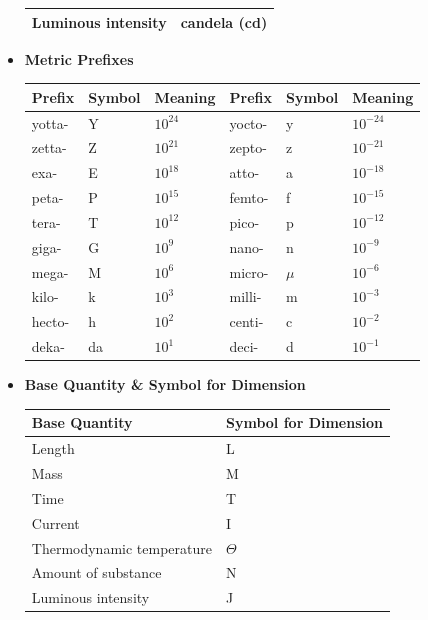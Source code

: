 \documentclass{report}
\begin{document}
\begin{itemize}
\begin{tabularx}{\textwidth}{|X|X|}
                Luminous intensity & candela (cd) \\
                \hline
            \end{tabularx}
            \pagebreak 
        \item \textbf{Metric Prefixes}
            \begin{center}
                \begin{tabularx}{\textwidth}{|X|X|X|X|X|X|}
                    \hline
                    Prefix & Symbol & Meaning & Prefix & Symbol & Meaning \\ 
                    \hline
                    yotta- & Y & $10^{24}$ & yocto- & y & $10^{-24}$ \\
                    zetta- & Z & $10^{21}$ & zepto- & z & $10^{-21}$ \\
                    exa-   & E & $10^{18}$ & atto-  & a & $10^{-18}$ \\
                    peta-  & P & $10^{15}$ & femto- & f & $10^{-15}$ \\
                    tera-  & T & $10^{12}$ & pico-  & p & $10^{-12}$ \\
                    giga-  & G & $10^9$   & nano-  & n & $10^{-9}$  \\
                    mega-  & M & $10^6$   & micro- & $\mu$ & $10^{-6}$ \\
                    kilo-  & k & $10^3$   & milli- & m & $10^{-3}$ \\
                    hecto- & h & $10^2$   & centi- & c & $10^{-2}$ \\
                    deka-  & da & $10^1$  & deci-  & d & $10^{-1}$ \\
                    \hline
                \end{tabularx}
            \end{center}
            \bigbreak \noindent 
        \item \textbf{Base Quantity \& Symbol for Dimension}
            \begin{center}
                \begin{tabularx}{\textwidth}{|X|X|}
                    \hline
                    Base Quantity & Symbol for Dimension \\
                    \hline
                    Length & L \\
                    Mass & M \\
                    Time & T \\
                    Current & I \\
                    Thermodynamic temperature & $\Theta$ \\
                    Amount of substance & N \\
                    Luminous intensity & J \\
                    \hline
                \end{tabularx}
            \end{center}
    \end{itemize}
\end{document}
